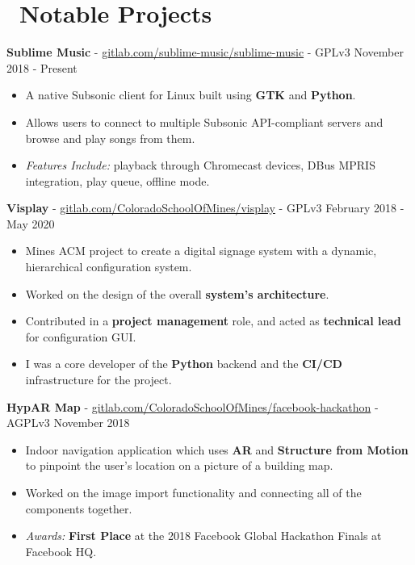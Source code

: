 \documentclass[10pt,letterpaper]{article}
\begin{document}
\section*{\faCode\ Notable Projects}
\textbf{Sublime Music} -
\href{https://gitlab.com/sublime-music/sublime-music}{gitlab.com/sublime-music/sublime-music}
- GPLv3 \hfill November 2018 - Present
\begin{itemize}
    \item A native Subsonic client for Linux built using \textbf{GTK} and
        \textbf{Python}.
    \item Allows users to connect to multiple Subsonic API-compliant servers and
        browse and play songs from them.
    \item \textit{Features Include:} playback through Chromecast devices, DBus
        MPRIS integration, play queue, offline mode.
\end{itemize}

\textbf{Visplay} -
\href{https://gitlab.com/ColoradoSchoolOfMines/visplay}{gitlab.com/ColoradoSchoolOfMines/visplay}
- GPLv3 \hfill February 2018 - May 2020
\begin{itemize}
    \item Mines ACM project to create a digital signage system with a dynamic,
        hierarchical configuration system.
    \item Worked on the design of the overall \textbf{system's architecture}.
    \item Contributed in a \textbf{project management} role, and acted as
        \textbf{technical lead} for configuration GUI.
    \item I was a core developer of the \textbf{Python} backend and the
        \textbf{CI/CD} infrastructure for the project.
\end{itemize}

\textbf{HypAR Map} -
\href{https://gitlab.com/ColoradoSchoolOfMines/facebook-hackathon}{gitlab.com/ColoradoSchoolOfMines/facebook-hackathon}
- AGPLv3 \hfill November 2018
\begin{itemize}
    \item Indoor navigation application which uses \textbf{AR} and
        \textbf{Structure from Motion} to pinpoint the user's location on a
        picture of a building map.
    \item Worked on the image import functionality and connecting all of the
        components together.
    \item \textit{Awards:} \textbf{First Place} at the 2018 Facebook Global
        Hackathon Finals at Facebook HQ.
\end{itemize}
\end{document}
